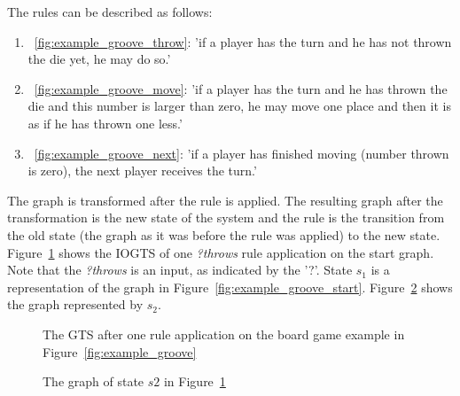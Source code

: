The rules can be described as follows:
\begin{enumerate}
  \item~\ref{fig:example_groove_throw}: 'if a player has the turn and he has not thrown the die yet, he may do so.'
  \item~\ref{fig:example_groove_move}: 'if a player has the turn and he has thrown the die and this number is larger than zero, he may move one place and then it is as if he has thrown one less.'
  \item~\ref{fig:example_groove_next}: 'if a player has finished moving (number thrown is zero), the next player receives the turn.'
\end{enumerate}

The graph is transformed after the rule is applied. The resulting graph after the transformation is the new state of the system and the rule is the transition from the old state (the graph as it was before the rule was applied) to the new state. Figure~\ref{fig:gts_example} shows the IOGTS of one \textit{?throws} rule application on the start graph. Note that the \textit{?throws} is an input, as indicated by the '?'. State $s_1$ is a representation of the graph in Figure~\ref{fig:example_groove_start}. Figure~\ref{fig:target_graph_state} shows the graph represented by $s_2$.

\begin{figure}[h]
  \begin{center}
    
  \end{center}
  \caption{The GTS after one rule application on the board game example in Figure~\ref{fig:example_groove}}
  \label{fig:gts_example}
\end{figure}

\begin{figure}[h]
  \begin{center}
    
  \end{center}
  \caption{The graph of state $s2$ in Figure~\ref{fig:gts_example}}
  \label{fig:target_graph_state}
\end{figure}